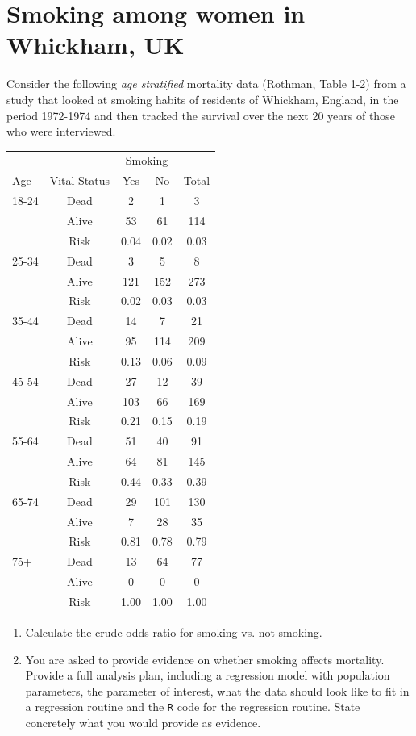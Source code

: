 \documentclass[landscape,twocolumn,letterpaper,9pt,reqno]{article}\usepackage[]{graphicx}\usepackage[]{color}
\newcommand{\compresslist}{ %
	\setlength{\itemsep}{1pt}
	\setlength{\parskip}{0pt}
	\setlength{\parsep}{0pt}
}
\begin{document}
\clearpage

\section{Smoking among women in Whickham, UK}
Consider the following \textit{age stratified} mortality data (Rothman, Table 1-2) from a study that looked at smoking habits of residents of Whickham, England, in the period 1972-1974 and then tracked the survival over the next 20 years of those who were interviewed. 


\begin{table}[h]
	\centering
	\begin{tabular}{lcccc}
		 &  &   \multicolumn{2}{c}{Smoking} &  \\		
		Age & Vital Status &  Yes & No & Total \\
		18-24 	& Dead 	& 2  	& 1 	& 3 	\\	
		 		& Alive & 53  	& 61 	& 114 	\\
		 		& Risk & 0.04  	& 0.02 	& 0.03 	\\
		 		\hline
		25-34 	& Dead 	& 3  	& 5 	& 8 	\\	
& Alive & 121  	& 152 	& 273 	\\
& Risk & 0.02  	& 0.03 	& 0.03 \\
\hline 			
35-44 	& Dead 	& 14  	& 7 	& 21 	\\	
& Alive & 95  	& 114 	& 209 	\\
& Risk & 0.13  	& 0.06 	& 0.09 \\
\hline
45-54 	& Dead 	& 27  	& 12 	& 39 	\\	
& Alive & 103  	& 66 	& 169 	\\
& Risk & 0.21  	& 0.15 	& 0.19 \\
		 		\hline
55-64 	& Dead 	& 51  	& 40 	& 91 	\\	
& Alive & 64  	& 81 	& 145 	\\
& Risk & 0.44  	& 0.33 	& 0.39 \\
		 		\hline
65-74 	& Dead 	& 29  	& 101 	& 130 	\\	
& Alive & 7  	& 28 	& 35 	\\
& Risk & 0.81  	& 0.78 	& 0.79 \\
		 		\hline
75+ 	& Dead 	& 13  	& 64 	& 77 	\\	
& Alive & 0  	& 0 	& 0 	\\
& Risk & 1.00  	& 1.00 	& 1.00 \\
\hline
	\end{tabular}
\end{table}



\begin{enumerate}\compresslist
	\item Calculate the crude odds ratio for smoking vs. not smoking. 
	\item You are asked to provide evidence on whether smoking affects mortality. Provide a full analysis plan, including a regression model with population parameters, the parameter of interest, what the data should look like to fit in a regression routine and the \texttt{R} code for the regression routine. State concretely what you would provide as evidence. 
\end{enumerate}
\end{document}
